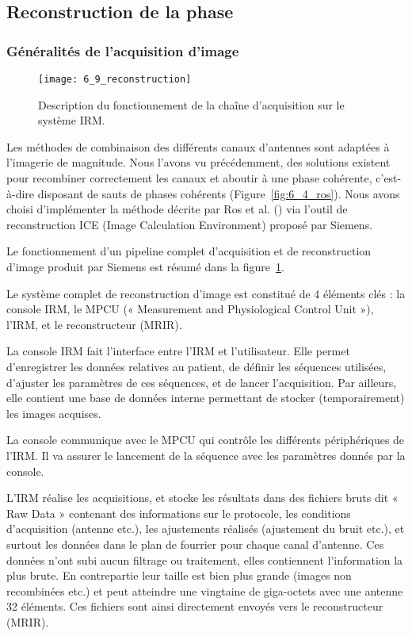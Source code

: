 {%
\subsection{Reconstruction de la phase}
\subsubsection{Généralités de l’acquisition d’image}
\begin{figure}[!t]
\centering
\texttt{[image: 6\_9\_reconstruction]}
\caption{Description du fonctionnement de la cha\^ine d'acquisition sur le système IRM.}
\label{fig:6_9_reconstruction}	
\end{figure}
Les méthodes de combinaison des différents canaux d’antennes sont adaptées à l’imagerie de
magnitude. Nous l’avons vu précédemment, des solutions existent pour recombiner correctement les
canaux et aboutir à une phase cohérente, c’est-à-dire disposant de sauts de phases cohérents (Figure~\ref{fig:6_4_ros}). Nous avons choisi d’implémenter la méthode décrite par Ros et al. (\cite{Ros2009}) via l’outil de
reconstruction ICE (Image Calculation Environment) proposé par Siemens.

Le fonctionnement d’un pipeline complet d’acquisition et de reconstruction d’image produit
par Siemens est résumé dans la figure~\ref{fig:6_9_reconstruction}.

Le système complet de reconstruction d’image est constitué de 4 éléments clés : la console
IRM, le MPCU (« Measurement and Physiological Control Unit »), l’IRM, et le reconstructeur (MRIR).

La console IRM fait l’interface entre l’IRM et l’utilisateur. Elle permet d’enregistrer les données
relatives au patient, de définir les séquences utilisées, d’ajuster les paramètres de ces séquences, et
de lancer l’acquisition. Par ailleurs, elle contient une base de données interne permettant de stocker
(temporairement) les images acquises.

La console communique avec le MPCU qui contrôle les différents périphériques de l’IRM. Il va
assurer le lancement de la séquence avec les paramètres donnés par la console.

L’IRM réalise les acquisitions, et stocke les résultats dans des fichiers bruts dit « Raw Data »
contenant des informations sur le protocole, les conditions d’acquisition (antenne etc.), les
ajustements réalisés (ajustement du bruit etc.), et surtout les données dans le plan de fourrier pour
chaque canal d’antenne. Ces données n’ont subi aucun filtrage ou traitement, elles contiennent
l’information la plus brute. En contrepartie leur taille est bien plus grande (images non recombinées
etc.) et peut atteindre une vingtaine de giga-octets avec une antenne 32 éléments. Ces fichiers sont
ainsi directement envoyés vers le reconstructeur (MRIR).

}
